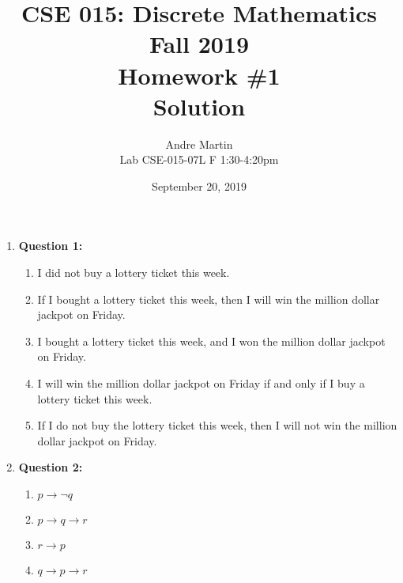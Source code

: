 \documentclass[11pt]{article}
\begin{document}
\author{Andre Martin\\
Lab CSE-015-07L F 1:30-4:20pm}

\title{CSE 015: Discrete Mathematics\\
Fall 2019\\
Homework \#1\\
Solution}

\date{September 20, 2019}
\maketitle

\begin{enumerate}

\item
\textbf{Question 1:}

\begin{enumerate}[label=(\alph*)]
\item
I did not buy a lottery ticket this week.

\item
If I bought a lottery ticket this week, then I will win the million dollar jackpot on Friday.

\item
I bought a lottery ticket this week, and I won the million dollar jackpot on Friday.

\item
I will win the million dollar jackpot on Friday if and only if I buy a lottery ticket this week.

\item
If I do not buy the lottery ticket this week, then I will not win the million dollar jackpot on Friday.

\end{enumerate}

\item
\textbf{Question 2:}

\begin{enumerate}[label=(\alph*)]
\item
$p \rightarrow \neg q$

\item
$p \rightarrow q \rightarrow r$

\item 
$r \rightarrow p$

\item
$q \rightarrow p \rightarrow r$


\end{enumerate}
\end{enumerate}
\end{document}
